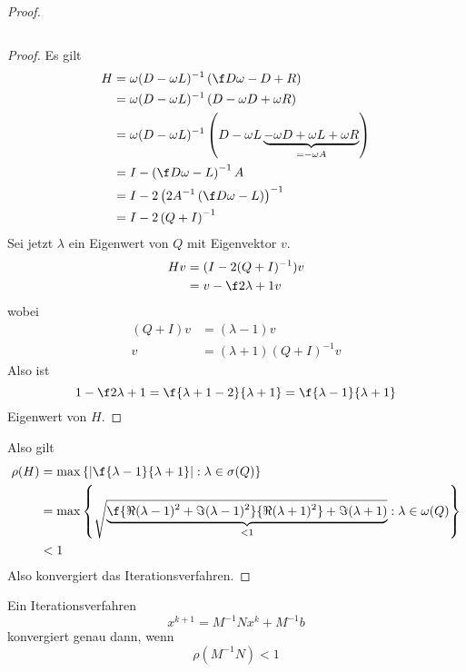 \documentclass[a4paper]{scrartcl}
\numberwithin{equation}{section}
\begin{document}
\begin{st}
\begin{proof}
\begin{enumerate}[{Beh. }1:]
\[				\]
				\begin{proof}
					Es gilt
					\begin{align*}
						H &= \omega(D-\omega L)^{-1} \left(\f D\omega -D+R\right)\\
						  &= \omega(D-\omega L)^{-1} \left(D - \omega D +\omega R\right)\\
						  &= \omega(D-\omega L)^{-1} \left(D - \omega L \underbrace{- \omega D +\omega L + \omega R}_{=-\omega A}\right)\\
						  &= I -\left( \f D\omega -L\right)^{-1} A\\
						  &= I - 2 \left( 2A^{-1} \left( \f D\omega -L\right)\right)^{-1}\\
						  &= I- 2 \left(Q+I\right)^{-1}
					\end{align*}
					Sei jetzt $\lambda$ ein Eigenwert von $Q$ mit Eigenvektor $v$.
					\begin{align*}
						Hv &= (I - 2(Q+I)^{-1})v\\
						   &= v-\f 2{\lambda+1}v
					\end{align*}
					wobei
					\begin{align*}
						(Q+I)v &=(\lambda -1)v\\
						v &= (\lambda+1)(Q+I)^{-1}v
					\end{align*}
					Also ist 
					\[
						1-\f 2{\lambda +1}=	\f {\lambda+1-2}{\lambda+1} = \f {\lambda-1}{\lambda+1}
					\]
					Eigenwert von $H$.
				\end{proof}
		\end{enumerate}
		Also gilt
		\begin{align*}
			\rho(H) &= \max\left\{\left |\f {\lambda-1}{\lambda+1}\right| : \lambda\in \sigma(Q)\right\}\\
								   &= \max\left\{\sqrt{\underbrace{\f {\Re (\lambda-1)^2 + \Im (\lambda -1)^2}{\Re(\lambda+1)^2} + \Im(\lambda+1)}_{<1}}:\lambda \in \omega(Q)\right\}\\
					&< 1
		\end{align*}
		Also konvergiert das Iterationsverfahren.		
	\end{proof}
\end{st}

\setcounter{thm}{11}

\begin{st}
	\label{st:4.12}
	Ein Iterationsverfahren
	\[
		x^{k+1} = M^{-1}Nx^k + M^{-1}b
	\]
	konvergiert genau dann, wenn
	\[
		\rho(M^{-1}N) < 1
	\]
\end{st}
\end{document}
